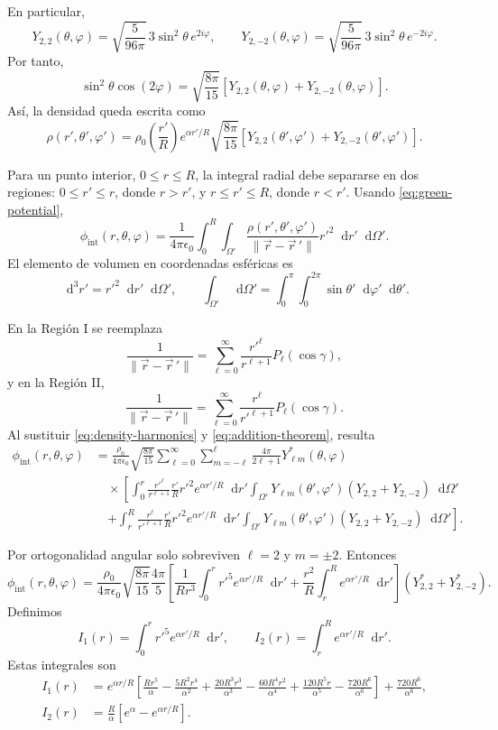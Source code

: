 \documentclass[a4paper]{article}
\newcommand{\dd}{\mathop{}\!\mathrm{d}}
\begin{document}
\begin{enumerate}[a)]
En particular,
\[
Y_{2,2}(\theta,\varphi)=\sqrt{\frac{5}{96\pi}}\,3\sin^2\theta\,e^{2i\varphi},
\qquad
Y_{2,-2}(\theta,\varphi)=\sqrt{\frac{5}{96\pi}}\,3\sin^2\theta\,e^{-2i\varphi}.
\]
Por tanto,
\[
\sin^2\theta\cos(2\varphi)
=\sqrt{\frac{8\pi}{15}}\left[Y_{2,2}(\theta,\varphi)+Y_{2,-2}(\theta,\varphi)\right].
\]
Así, la densidad queda escrita como
\begin{equation}
\label{eq:density-harmonics}
\rho(r',\theta',\varphi')=\rho_0\left(\frac{r'}{R}\right)e^{\alpha r'/R}
\sqrt{\frac{8\pi}{15}}\left[Y_{2,2}(\theta',\varphi')+Y_{2,-2}(\theta',\varphi')\right].
\end{equation}

Para un punto interior, $0\le r\le R$, la integral radial debe separarse en dos regiones:
$0\le r'\le r$, donde $r>r'$, y $r\le r'\le R$, donde $r<r'$. Usando \eqref{eq:green-potential},
\[
\phi_{\mathrm{int}}(r,\theta,\varphi)
=\frac{1}{4\pi\epsilon_0}\int_0^R\int_{\Omega'}
\frac{\rho(r',\theta',\varphi')}{\lVert\vec r-\vec r\,'\rVert}r'^2\dd r'\dd\Omega'.
\]
El elemento de volumen en coordenadas esféricas es
\[
\dd^3r'=r'^2\dd r'\dd\Omega',
\qquad
\int_{\Omega'}\dd\Omega'=\int_0^\pi\int_0^{2\pi}\sin\theta'\dd\varphi'\dd\theta'.
\]

En la Región I se reemplaza
\[
\frac{1}{\lVert\vec r-\vec r\,'\rVert}
=\sum_{\ell=0}^{\infty}\frac{r'^\ell}{r^{\ell+1}}P_\ell(\cos\gamma),
\]
y en la Región II,
\[
\frac{1}{\lVert\vec r-\vec r\,'\rVert}
=\sum_{\ell=0}^{\infty}\frac{r^\ell}{r'^{\ell+1}}P_\ell(\cos\gamma).
\]
Al sustituir \eqref{eq:density-harmonics} y \eqref{eq:addition-theorem}, resulta
\begin{align*}
\phi_{\mathrm{int}}(r,\theta,\varphi)
&=\frac{\rho_0}{4\pi\epsilon_0}\sqrt{\frac{8\pi}{15}}
\sum_{\ell=0}^{\infty}\sum_{m=-\ell}^{\ell}\frac{4\pi}{2\ell+1}Y_{\ell m}^*(\theta,\varphi) \\
&\quad \times \left[
\int_0^r\frac{r'^\ell}{r^{\ell+1}}\frac{r'}{R}r'^2e^{\alpha r'/R}\dd r'
\int_{\Omega'}Y_{\ell m}(\theta',\varphi')\left(Y_{2,2}+Y_{2,-2}\right)\dd\Omega'
\right.\\
&\quad\left.+
\int_r^R\frac{r^\ell}{r'^{\ell+1}}\frac{r'}{R}r'^2e^{\alpha r'/R}\dd r'
\int_{\Omega'}Y_{\ell m}(\theta',\varphi')\left(Y_{2,2}+Y_{2,-2}\right)\dd\Omega'
\right].
\end{align*}

Por ortogonalidad angular solo sobreviven $\ell=2$ y $m=\pm2$. Entonces
\[
\phi_{\mathrm{int}}(r,\theta,\varphi)
=\frac{\rho_0}{4\pi\epsilon_0}\sqrt{\frac{8\pi}{15}}\frac{4\pi}{5}
\left[\frac{1}{Rr^3}\int_0^r r'^5e^{\alpha r'/R}\dd r'
+\frac{r^2}{R}\int_r^R e^{\alpha r'/R}\dd r'\right]
\left(Y_{2,2}^*+Y_{2,-2}^*\right).
\]
Definimos
\[
I_1(r)=\int_0^r r'^5e^{\alpha r'/R}\dd r',
\qquad
I_2(r)=\int_r^R e^{\alpha r'/R}\dd r'.
\]
Estas integrales son
\begin{align*}
I_1(r)
&=e^{\alpha r/R}\left[\frac{Rr^5}{\alpha}-\frac{5R^2r^4}{\alpha^2}
+\frac{20R^3r^3}{\alpha^3}-\frac{60R^4r^2}{\alpha^4}
+\frac{120R^5r}{\alpha^5}-\frac{720R^6}{\alpha^6}\right]
+\frac{720R^6}{\alpha^6},\\
I_2(r)&=\frac{R}{\alpha}\left[e^\alpha-e^{\alpha r/R}\right].
\end{align*}


\end{enumerate}
\end{document}

